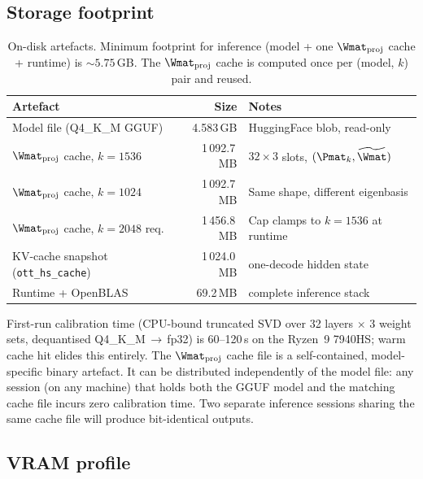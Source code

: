\documentclass[11pt]{article}
\begin{document}
\subsection{Storage footprint}

\begin{table}[h]\centering\footnotesize
\caption{On-disk artefacts. Minimum footprint for inference (model + one
$\Wmat_\text{proj}$ cache + runtime) is ${\sim}5.75$\,GB. The
$\Wmat_\text{proj}$ cache is computed once per (model, $k$) pair and reused.}
\begin{tabular}{@{}lrl@{}}
\toprule
Artefact & Size & Notes\\
\midrule
Model file (Q4\_K\_M GGUF)                  & 4.583\,GB   & HuggingFace blob, read-only\\
$\Wmat_\text{proj}$ cache, $k{=}1536$       & 1\,092.7\,MB & $32{\times}3$ slots, $(\Pmat_k,\widetilde\Wmat)$\\
$\Wmat_\text{proj}$ cache, $k{=}1024$       & 1\,092.7\,MB & Same shape, different eigenbasis\\
$\Wmat_\text{proj}$ cache, $k{=}2048$ req.\ & 1\,456.8\,MB & Cap clamps to $k{=}1536$ at runtime\\
KV-cache snapshot (\texttt{ott\_hs\_cache}) & 1\,024.0\,MB & one-decode hidden state\\
Runtime + OpenBLAS                          & 69.2\,MB     & complete inference stack\\
\bottomrule
\end{tabular}
\end{table}

First-run calibration time (CPU-bound truncated SVD over 32 layers $\times$
3 weight sets, dequantised Q4\_K\_M\,$\to$\,fp32) is 60--120\,s on the
Ryzen~9 7940HS; warm cache hit elides this entirely.
The $\Wmat_\text{proj}$ cache file is a self-contained, model-specific
binary artefact. It can be distributed independently of the model file:
any session (on any machine) that holds both the GGUF model and the
matching cache file incurs zero calibration time.  Two separate inference
sessions sharing the same cache file will produce bit-identical outputs.

\subsection{VRAM profile}
\end{document}
